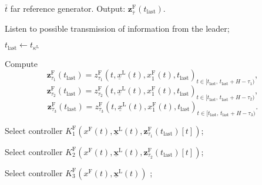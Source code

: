 \documentclass[letterpaper, 10 pt, conference]{ieeeconf}
\theoremstyle{definition}
\theoremstyle{nopoint}
\begin{document}
\begin{algorithm}
\caption{$\bar{t}$ far reference generator. Output: $\mathbf{z}_{\bar{\tau}}^\mathrm{F}(t_{\mathrm{last}})$. }\label{alg:switched_controller}
\begin{algorithmic}[1]
\Loop

\State Listen to possible transmission of information from the leader;

 
\State $t_{\mathrm{last}} \leftarrow t_{\kappa^\mathrm{L}}$

\State Compute
\begin{equation}\label{eq:reference_z_F_tau_1}
 \mathbf{z}_{\tau_1}^\mathrm{F}(t_{\mathrm{last}})={z_{\tau_1}^\mathrm{F}(t,\underline{x}^\mathrm{L}(t),x_1^\mathrm{F}(t),t_{\mathrm{last}})}_{t\in [t_{\mathrm{last}}, \, t_{\mathrm{last}}+H-\tau_1 )},
\end{equation}
\begin{equation}\label{eq:reference_z_F_tau_2}
 \mathbf{z}_{\tau_2}^\mathrm{F}(t_{\mathrm{last}})={z_{\tau_2}^\mathrm{F}(t,\underline{x}^\mathrm{L}(t),x_1^\mathrm{F}(t),t_{\mathrm{last}})}_{t\in [t_{\mathrm{last}}, \, t_{\mathrm{last}}+H-\tau_2 )},
\end{equation}
\begin{equation}\label{eq:reference_z_F_tau_3}
 \mathbf{z}_{\tau_3}^\mathrm{F}(t_{\mathrm{last}})={z_{\tau_3}^\mathrm{F}(t,\underline{x}^\mathrm{L}(t),x_1^\mathrm{F}(t),t_{\mathrm{last}})}_{t\in [t_{\mathrm{last}}, \, t_{\mathrm{last}}+H-\tau_3 )}.
\end{equation}



\State Select controller $K^{\mathrm{F}}_1(x^{\mathrm{F}}(t),\underline{\mathbf{x}}^\mathrm{L}(t),\mathbf{z}_{\tau_1}^\mathrm{F}(t_{\mathrm{last}})[t])$;






\State Select controller $K^{\mathrm{F}}_2(x^{\mathrm{F}}(t),\underline{\mathbf{x}}^\mathrm{L}(t),\mathbf{z}_{\tau_2}^\mathrm{F}(t_{\mathrm{last}})[t])$;

\Else

\State Select controller $K^{\mathrm{F}}_3(x^{\mathrm{F}}(t),\underline{\mathbf{x}}^\mathrm{L}(t))$ ;

\EndIf

\EndIf





\EndLoop

\end{algorithmic}
\end{algorithm}
\end{document}
